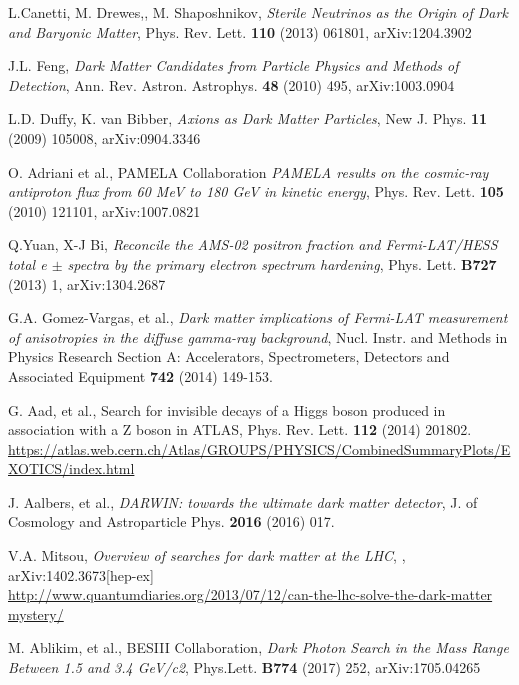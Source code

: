\documentclass{cernyrep}
\begin{document}
\begin{thebibliography}{100}
L.Canetti, M. Drewes,, M. Shaposhnikov, {\it Sterile Neutrinos as the Origin of Dark and
Baryonic Matter}, Phys. Rev. Lett. {\bf 110} (2013) 061801, arXiv:1204.3902

J.L. Feng, {\it Dark Matter Candidates from Particle Physics and Methods of Detection}, 
Ann. Rev. Astron. Astrophys. {\bf 48} (2010) 495, arXiv:1003.0904

L.D. Duffy, K. van Bibber, {\it Axions as Dark Matter Particles},  New J. Phys. {\bf 11} (2009) 105008, arXiv:0904.3346


O. Adriani et al., PAMELA Collaboration  {\it PAMELA results on the cosmic-ray antiproton flux from 60 MeV to 180 GeV in kinetic energy},  Phys. Rev. Lett. {\bf 105} (2010) 121101, arXiv:1007.0821

Q.Yuan, X-J Bi, {\it Reconcile the AMS-02 positron fraction and Fermi-LAT/HESS total e $\pm$ spectra by the primary electron spectrum hardening},  Phys. Lett. {\bf B727} (2013) 1,
arXiv:1304.2687

G.A. Gomez-Vargas, et al., {\it Dark matter implications of Fermi-LAT measurement of anisotropies in the diffuse gamma-ray background},  Nucl. Instr. and Methods in Physics Research Section A: Accelerators, Spectrometers, Detectors and Associated Equipment {\bf 742} (2014) 149-153.


G. Aad, et al., {Search for invisible decays of a Higgs boson produced in association with a Z boson in ATLAS},  Phys. Rev. Lett. {\bf 112}  (2014) 201802.\\
\url{https://atlas.web.cern.ch/Atlas/GROUPS/PHYSICS/CombinedSummaryPlots/EXOTICS/index.html}

J. Aalbers, et al., {\it DARWIN: towards the ultimate dark matter detector},  J. of Cosmology and Astroparticle Phys. {\bf 2016}  (2016) 017.

V.A. Mitsou, {\it Overview of searches for dark matter at the LHC}, , arXiv:1402.3673[hep-ex]\\
\url{http://www.quantumdiaries.org/2013/07/12/can-the-lhc-solve-the-dark-matter}\\
\url{mystery/}

M. Ablikim, et al., BESIII Collaboration, 
{\it Dark Photon Search in the Mass Range Between 1.5 and 3.4 GeV/c2}, Phys.Lett. {\bf B774} (2017) 252, arXiv:1705.04265




\end{thebibliography}
\end{document}
